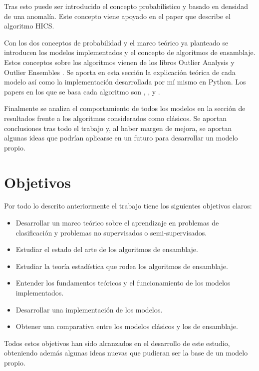 Tras esto puede ser introducido el concepto probabilístico y basado en densidad de una anomalía. Este concepto viene apoyado en el paper \cite{fabian_keller_hics:_2012} que describe el algoritmo HICS.

Con los dos conceptos de probabilidad y el marco teórico ya planteado se introducen los modelos implementados y el concepto de algoritmos de ensamblaje. Estos conceptos sobre los algoritmos vienen de los libros Outlier Analysis \cite{aggarwal_outlier_2017-1} y Outlier Ensembles \cite{aggarwal_outlier_2017}. Se aporta en esta sección la explicación teórica de cada modelo así como la implementación desarrollada por mí mismo en Python. Los papers en los que se basa cada algoritmo son \cite{fabian_keller_hics:_2012}, \cite{aggarwal_outlier_2017}, \cite{pevny_loda:_2016} y \cite{muller_statistical_2011}.

Finalmente se analiza el comportamiento de todos los modelos en la sección de resultados frente a los algoritmos considerados como clásicos. Se aportan conclusiones tras todo el trabajo y, al haber margen de mejora, se aportan algunas ideas que podrían aplicarse en un futuro para desarrollar un modelo propio.

\section{Objetivos}

Por todo lo descrito anteriormente el trabajo tiene los siguientes objetivos claros:

\begin{itemize}
	\item Desarrollar un marco teórico sobre el aprendizaje en problemas de clasificación y problemas no supervisados o semi-supervisados.
	\item Estudiar el estado del arte de los algoritmos de ensamblaje.
	\item Estudiar la teoría estadística que rodea los algoritmos de ensamblaje.
	\item Entender los fundamentos teóricos y el funcionamiento de los modelos implementados.
	\item Desarrollar una implementación de los modelos.
	\item Obtener una comparativa entre los modelos clásicos y los de ensamblaje.
\end{itemize}

Todos estos objetivos han sido alcanzados en el desarrollo de este estudio, obteniendo además algunas ideas nuevas que pudieran ser la base de un modelo propio.